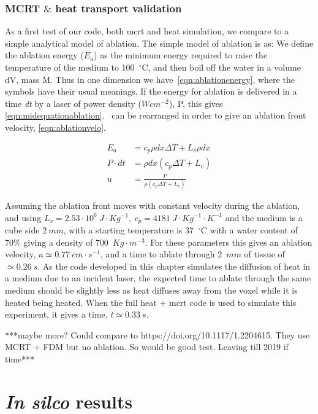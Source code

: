 \subsubsection{MCRT \texorpdfstring{$\&$}{and} heat transport validation}


As a first test of our code, both \gls{mcrt} and heat simulation, we compare to a simple analytical model of ablation. The simple model of ablation is as: We define the ablation energy ($E_a$) as the minimum energy required to raise the temperature of the medium to 100~$^{\circ}$C, and then boil off the water in a volume dV, mass M. Thus in one dimension we have~\cref{eqn:ablationenergy}, where the symbols have their usual meanings. If the energy for ablation is delivered in a time \textit{dt} by a laser of power density ($Wcm^{-2}$), P, this gives \cref{eqn:midequationablation}.~ can be rearranged in order to give an ablation front velocity, \cref{eqn:ablationvelo}.


\begin{align}
E_a &= c_p \rho dx \Delta T + L_v \rho dx \label{eqn:ablationenergy}\\
P\cdot dt &= \rho dx (c_p \Delta T + L_v) \label{eqn:midequationablation} \\
u &= \frac{P}{\rho(c_p\Delta T+ L_v)} \label{eqn:ablationvelo}
\end{align}

Assuming the ablation front moves with constant velocity during the ablation, and using $L_v=2.53\cdot 10^6\ J\cdot Kg^{-1},\ c_p=4181\ J\cdot Kg^{-1}\cdot K^{-1}$ and the medium is a cube side $2\ mm$, with a starting temperature is 37~$^{\circ}$C with a water content of 70\% giving a density of 700~$Kg\cdot m^{-3}$. For these parameters this gives an ablation velocity, $u\simeq 0.77\ cm\cdot s^{-1}$, and a time to ablate through 2~$mm$ of tissue of $\simeq 0.26~s$.
As the code developed in this chapter simulates the diffusion of heat in a medium due to an incident laser, the expected time to ablate through the same medium should be slightly less as heat diffuses away from the voxel while it is heated being heated. When the full heat + \gls{mcrt} code is used to simulate this experiment, it gives a time, $t \simeq 0.33~s$.	

\medskip

***maybe more? Could compare to https://doi.org/10.1117/1.2204615. They use MCRT + FDM but no ablation. So would be good test. Leaving till 2019 if time***


\section{\textit{In silco} results} 

